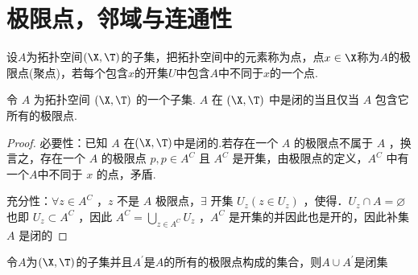 \section{极限点，邻域与连通性}
\begin{definition}\label{defoflimpoint}
	设$A$为拓扑空间$(\X,\T)$的子集，把拓扑空间中的元素称为点，点$x\in\X$称为$A$的极限点(聚点)，若每个包含$x$的开集$U$中包含$A$中不同于$x$的一个点.
\end{definition}
\begin{proposition}
	令 $A$ 为拓扑空间 $(\X, \T)$ 的一个子集. $A$ 在 $(\X, \T)$ 中是闭的当且仅当 $A$ 包含它所有的极限点.
\end{proposition}

\begin{proof}
	必要性：已知 $A$ 在$(\X, \T)$中是闭的.若存在一个 $A$ 的极限点不属于 $A$ ，换言之，存在一个 $A$ 的极限点 $p, p \in A^C$ 且 $A^C$ 是开集，由极限点的定义，$A^C$ 中有一个$A$中不同于 $x$ 的点，矛盾.
	
	充分性：$\forall z \in A^C$ ，$z$ 不是 $A$ 极限点，$\exists$ 开集 $U_z(z\in U_z)$ ，使得．$U_z \cap A=\varnothing$也即 $U_z\subset A^C$ ，因此 $A^C=\bigcup\limits_{z \in A^C} U_z$ ，$A^C$ 是开集的并因此也是开的，因此补集 $A$ 是闭的
\end{proof}
\begin{proposition}
	令$A$为$(\X,\T)$的子集并且$A^{\prime}$是$A$的所有的极限点构成的集合，则$A\cup A^{\prime}$是闭集
\end{proposition}

